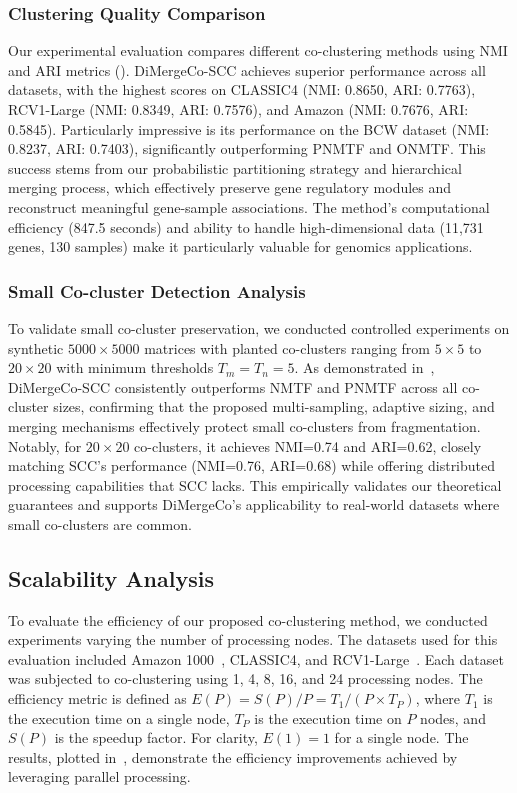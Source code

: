 \documentclass[journal]{IEEEtran}
\theoremstyle{definition}
\theoremstyle{remark} %
\renewcommand{\cite}[1]{~\autocite{#1}}
\begin{document}
\subsubsection{Clustering Quality Comparison}
\label{subsec:clustering-quality}
Our experimental evaluation compares different co-clustering methods using NMI and ARI metrics (). DiMergeCo-SCC achieves superior performance across all datasets, with the highest scores on CLASSIC4 (NMI: 0.8650, ARI: 0.7763), RCV1-Large (NMI: 0.8349, ARI: 0.7576), and Amazon (NMI: 0.7676, ARI: 0.5845). Particularly impressive is its performance on the BCW dataset (NMI: 0.8237, ARI: 0.7403), significantly outperforming PNMTF and ONMTF. This success stems from our probabilistic partitioning strategy and hierarchical merging process, which effectively preserve gene regulatory modules and reconstruct meaningful gene-sample associations. The method's computational efficiency (847.5 seconds) and ability to handle high-dimensional data (11,731 genes, 130 samples) make it particularly valuable for genomics applications.

\subsubsection{Small Co-cluster Detection Analysis}
{\color{blue}
    To validate small co-cluster preservation, we conducted controlled experiments on synthetic $5000 \times 5000$ matrices with planted co-clusters ranging from $5 \times 5$ to $20 \times 20$ with minimum thresholds $T_m = T_n = 5$. As demonstrated in~, DiMergeCo-SCC consistently outperforms NMTF and PNMTF across all co-cluster sizes, confirming that the proposed multi-sampling, adaptive sizing, and merging mechanisms effectively protect small co-clusters from fragmentation. Notably, for $20 \times 20$ co-clusters, it achieves NMI=0.74 and ARI=0.62, closely matching SCC's performance (NMI=0.76, ARI=0.68) while offering distributed processing capabilities that SCC lacks. This empirically validates our theoretical guarantees and supports DiMergeCo's applicability to real-world datasets where small co-clusters are common.
}

\subsection{Scalability Analysis}
\label{subsec:scalability-analysis}
To evaluate the efficiency of our proposed co-clustering method, we conducted experiments varying the number of processing nodes. The datasets used for this evaluation included Amazon 1000\cite{ni2019JustifyingRecommendationsUsing}, CLASSIC4, and RCV1-Large\cite{lewis2004Rcv1NewBenchmark}. Each dataset was subjected to co-clustering using 1, 4, 8, 16, and 24 processing nodes. {\color{blue}The efficiency metric is defined as $E(P) = S(P)/P = T_1/(P \times T_P)$, where $T_1$ is the execution time on a single node, $T_P$ is the execution time on $P$ nodes, and $S(P)$ is the speedup factor. For clarity, $E(1) = 1$ for a single node.} The results, plotted in~, demonstrate the efficiency improvements achieved by leveraging parallel processing.
\end{document}
